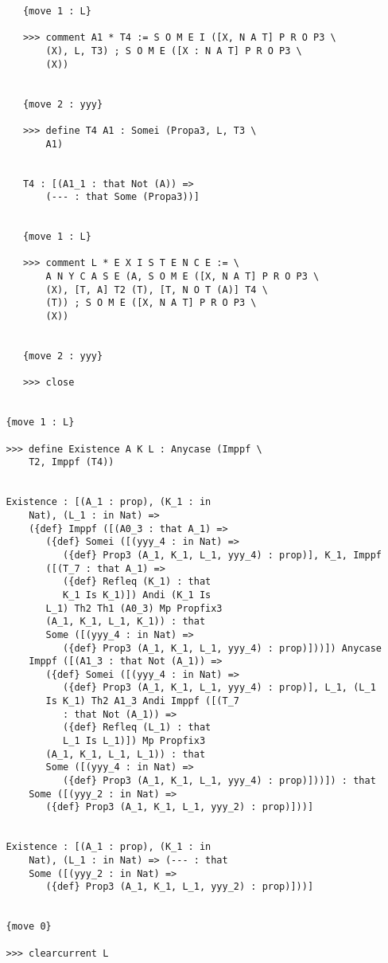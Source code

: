 \documentclass{article}
\begin{document}
\begin{verbatim}
      {move 1 : L}

      >>> comment A1 * T4 := S O M E I ([X, N A T] P R O P3 \
          (X), L, T3) ; S O M E ([X : N A T] P R O P3 \
          (X))


      {move 2 : yyy}

      >>> define T4 A1 : Somei (Propa3, L, T3 \
          A1)


      T4 : [(A1_1 : that Not (A)) => 
          (--- : that Some (Propa3))]


      {move 1 : L}

      >>> comment L * E X I S T E N C E := \
          A N Y C A S E (A, S O M E ([X, N A T] P R O P3 \
          (X), [T, A] T2 (T), [T, N O T (A)] T4 \
          (T)) ; S O M E ([X, N A T] P R O P3 \
          (X))


      {move 2 : yyy}

      >>> close


   {move 1 : L}

   >>> define Existence A K L : Anycase (Imppf \
       T2, Imppf (T4))


   Existence : [(A_1 : prop), (K_1 : in 
       Nat), (L_1 : in Nat) => 
       ({def} Imppf ([(A0_3 : that A_1) => 
          ({def} Somei ([(yyy_4 : in Nat) => 
             ({def} Prop3 (A_1, K_1, L_1, yyy_4) : prop)], K_1, Imppf 
          ([(T_7 : that A_1) => 
             ({def} Refleq (K_1) : that 
             K_1 Is K_1)]) Andi (K_1 Is 
          L_1) Th2 Th1 (A0_3) Mp Propfix3 
          (A_1, K_1, L_1, K_1)) : that 
          Some ([(yyy_4 : in Nat) => 
             ({def} Prop3 (A_1, K_1, L_1, yyy_4) : prop)]))]) Anycase 
       Imppf ([(A1_3 : that Not (A_1)) => 
          ({def} Somei ([(yyy_4 : in Nat) => 
             ({def} Prop3 (A_1, K_1, L_1, yyy_4) : prop)], L_1, (L_1 
          Is K_1) Th2 A1_3 Andi Imppf ([(T_7 
             : that Not (A_1)) => 
             ({def} Refleq (L_1) : that 
             L_1 Is L_1)]) Mp Propfix3 
          (A_1, K_1, L_1, L_1)) : that 
          Some ([(yyy_4 : in Nat) => 
             ({def} Prop3 (A_1, K_1, L_1, yyy_4) : prop)]))]) : that 
       Some ([(yyy_2 : in Nat) => 
          ({def} Prop3 (A_1, K_1, L_1, yyy_2) : prop)]))]


   Existence : [(A_1 : prop), (K_1 : in 
       Nat), (L_1 : in Nat) => (--- : that 
       Some ([(yyy_2 : in Nat) => 
          ({def} Prop3 (A_1, K_1, L_1, yyy_2) : prop)]))]


   {move 0}

   >>> clearcurrent L



\end{verbatim}
\end{document}
